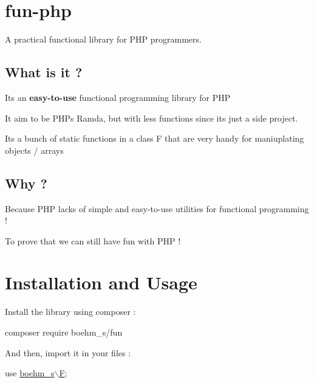 \section*{fun-\/php}

   \href{https://codeclimate.com/github/boehm-s/fun-php/maintainability}{\tt } 

A practical functional library for P\+HP programmers.

\subsection*{What is it ?}


\begin{DoxyItemize}
\item It\textquotesingle{}s an {\bfseries easy-\/to-\/use} functional programming library for P\+HP
\item It aim to be P\+HP\textquotesingle{}s Ramda, but with less functions since it\textquotesingle{}s just a side project.
\item It\textquotesingle{}s a bunch of static functions in a class {\ttfamily F} that are very handy for maniuplating objects / arrays
\end{DoxyItemize}

\subsection*{Why ?}


\begin{DoxyItemize}
\item Because P\+HP lacks of simple and easy-\/to-\/use utilities for functional programming !
\item To prove that we can still have fun with P\+HP !
\end{DoxyItemize}

\section*{Installation and Usage}

Install the library using composer \+:


\begin{DoxyCode}
composer require boehm\_s/fun
\end{DoxyCode}


And then, import it in your files \+:


\begin{DoxyCode}
use \hyperlink{classboehm__s_1_1F}{boehm\_s\(\backslash\)F};
\end{DoxyCode}


